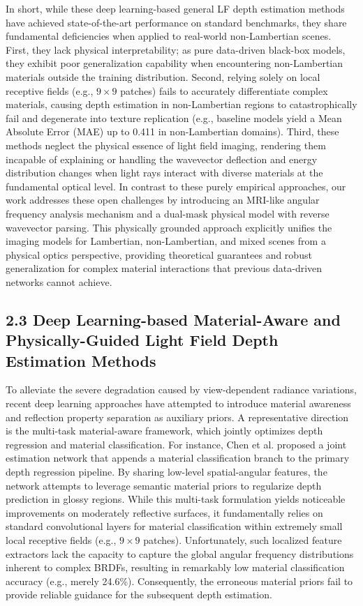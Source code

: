 \documentclass[journal]{IEEEtran}
\begin{document}
In short, while these deep learning-based general LF depth estimation methods have achieved state-of-the-art performance on standard benchmarks, they share fundamental deficiencies when applied to real-world non-Lambertian scenes. First, they lack physical interpretability; as pure data-driven black-box models, they exhibit poor generalization capability when encountering non-Lambertian materials outside the training distribution. Second, relying solely on local receptive fields (e.g., \(9 \times 9\) patches) fails to accurately differentiate complex materials, causing depth estimation in non-Lambertian regions to catastrophically fail and degenerate into texture replication (e.g., baseline models yield a Mean Absolute Error (MAE) up to 0.411 in non-Lambertian domains). Third, these methods neglect the physical essence of light field imaging, rendering them incapable of explaining or handling the wavevector deflection and energy distribution changes when light rays interact with diverse materials at the fundamental optical level. In contrast to these purely empirical approaches, our work addresses these open challenges by introducing an MRI-like angular frequency analysis mechanism and a dual-mask physical model with reverse wavevector parsing. This physically grounded approach explicitly unifies the imaging models for Lambertian, non-Lambertian, and mixed scenes from a physical optics perspective, providing theoretical guarantees and robust generalization for complex material interactions that previous data-driven networks cannot achieve.

\subsection{2.3 Deep Learning-based Material-Aware and Physically-Guided Light Field Depth Estimation Methods}

To alleviate the severe degradation caused by view-dependent radiance variations, recent deep learning approaches have attempted to introduce material awareness and reflection property separation as auxiliary priors. A representative direction is the multi-task material-aware framework, which jointly optimizes depth regression and material classification. For instance, Chen et al.  proposed a joint estimation network that appends a material classification branch to the primary depth regression pipeline. By sharing low-level spatial-angular features, the network attempts to leverage semantic material priors to regularize depth prediction in glossy regions. While this multi-task formulation yields noticeable improvements on moderately reflective surfaces, it fundamentally relies on standard convolutional layers for material classification within extremely small local receptive fields (e.g., \(9 \times 9\) patches). Unfortunately, such localized feature extractors lack the capacity to capture the global angular frequency distributions inherent to complex BRDFs, resulting in remarkably low material classification accuracy (e.g., merely 24.6\%). Consequently, the erroneous material priors fail to provide reliable guidance for the subsequent depth estimation.
\end{document}

